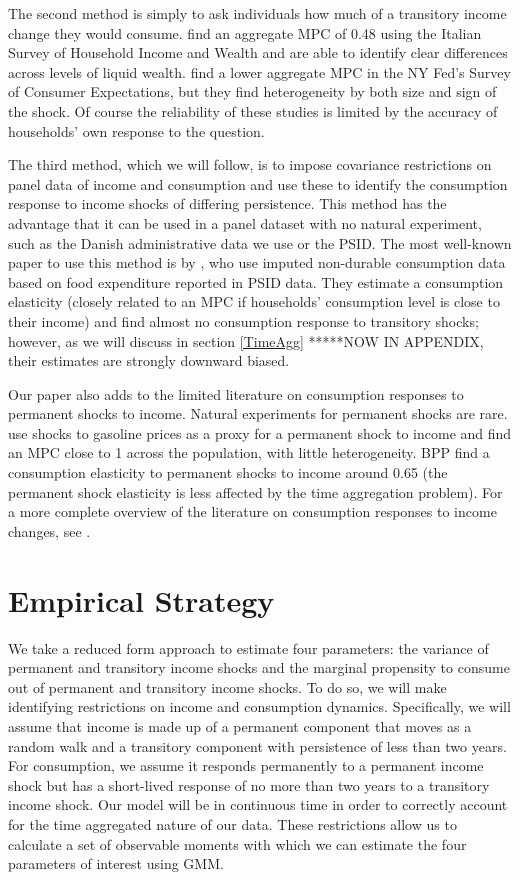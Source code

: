 \documentclass[titlepage]{\econtex}\newcommand{\texname}{ConsumptionHeterogeneity}
\begin{document}
	The second method is simply to ask individuals how much of a transitory income change they would consume. \cite{jappelli_fiscal_2014} find an aggregate MPC of 0.48 using the Italian Survey of Household Income and Wealth and are able to identify clear differences across levels of liquid wealth. \cite{fuster_what_2018} find a lower aggregate MPC in the NY Fed's Survey of Consumer Expectations, but they find heterogeneity by both size and sign of the shock. Of course the reliability of these studies is limited by the accuracy of households' own response to the question.
	
	The third method, which we will follow, is to impose covariance restrictions on panel data of income and consumption and use these to identify the consumption response to income shocks of differing persistence. This method has the advantage that it can be used in a panel dataset with no natural experiment, such as the Danish administrative data we use or the PSID. The most well-known paper to use this method is by \cite{blundell_consumption_2008}, who use imputed non-durable consumption data based on food expenditure reported in PSID data. They estimate a consumption elasticity (closely related to an MPC if households' consumption level is close to their income) and find almost no consumption response to transitory shocks; however, as we will discuss in section \ref{TimeAgg} *****NOW IN APPENDIX, their estimates are strongly downward biased.
	
	Our paper also adds to the limited literature on consumption responses to permanent shocks to income. Natural experiments for permanent shocks are rare. \cite{gelman_response_2016} use shocks to gasoline prices as a proxy for a permanent shock to income and find an MPC close to 1 across the population, with little heterogeneity. BPP find a consumption elasticity to permanent shocks to income around 0.65 (the permanent shock elasticity is less affected by the time aggregation problem). For a more complete overview of the literature on consumption responses to income changes, see \cite{jappelli_consumption_2010}.
	
	\section{Empirical Strategy} \label{empirical_strategy} 
	We take a reduced form approach to estimate four parameters: the variance of permanent and transitory income shocks and the marginal propensity to consume out of permanent and transitory income shocks. To do so, we will make identifying restrictions on income and consumption dynamics. Specifically, we will assume that income is made up of a permanent component that moves as a random walk and a transitory component with persistence of less than two years. For consumption, we assume it responds permanently to a permanent income shock but has a short-lived response of no more than two years to a transitory income shock. Our model will be in continuous time in order to correctly account for the time aggregated nature of our data. These restrictions allow us to calculate a set of observable moments with which we can estimate the four parameters of interest using GMM.
	
\end{document}
